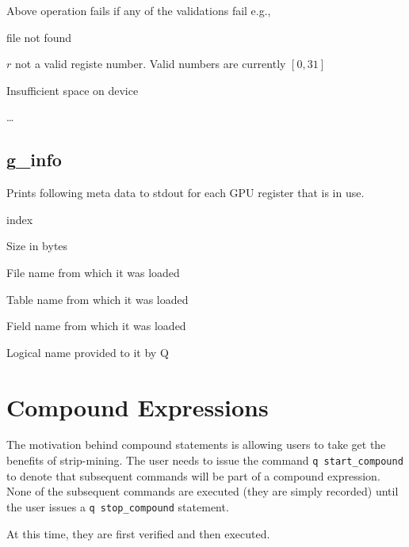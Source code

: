 \documentclass{report}
\begin{document}
Above operation fails if any of the validations fail e.g.,
\be
\item file not found
\item \(r\) not a valid registe number. Valid numbers are currently
\([0, 31]\)
\item Insufficient space on device
\item \ldots
\ee

\subsection{g\_info}
\label{g_info}

Prints following meta data to stdout for each GPU register that is in use.

\be
\item index
\item Size in bytes
\item File name from which it was loaded 
\item Table name from which it was loaded 
\item Field name from which it was loaded 
\item Logical name provided to it by Q 
\ee

\section{Compound Expressions}
\label{Compound}

The motivation behind compound statements is allowing users to take
get the benefits of strip-mining. The user needs to issue the command
{\tt q start\_compound} to denote that subsequent commands will be part of
a compound expression. None of the subsequent commands are executed
(they are simply recorded) until the user issues a {\tt q
  stop\_compound} statement.

At this time, they are first verified and then executed.
\end{document}
